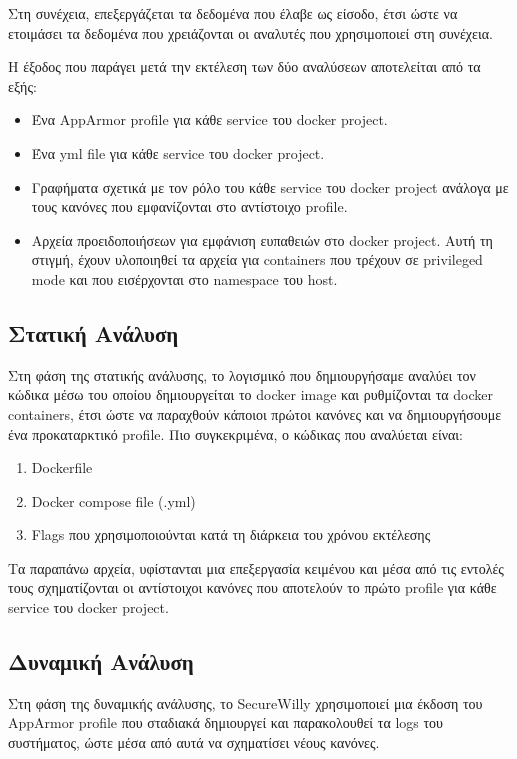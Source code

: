 Στη συνέχεια, επεξεργάζεται τα δεδομένα που έλαβε ως είσοδο, έτσι ώστε να ετοιμάσει τα δεδομένα που χρειάζονται οι αναλυτές που χρησιμοποιεί στη συνέχεια.

Η έξοδος που παράγει μετά την εκτέλεση των δύο αναλύσεων αποτελείται από τα εξής:
\begin{itemize}
\item Ένα \en AppArmor profile\gr{} για κάθε \en service\gr{} του \en docker project\gr{}.
\item Ένα \en yml file\gr{} για κάθε \en service\gr{} του \en docker project\gr{}.
\item Γραφήματα σχετικά με τον ρόλο του κάθε \en service\gr{} του \en docker project\gr{} ανάλογα με τους κανόνες που εμφανίζονται στο αντίστοιχο \en profile\gr{}.
\item Αρχεία προειδοποιήσεων για εμφάνιση ευπαθειών στο \en docker project\gr{}. Αυτή τη στιγμή, έχουν υλοποιηθεί τα αρχεία για \en containers\gr{} που τρέχουν σε \en privileged mode\gr{} και που εισέρχονται στο \en namespace\gr{} του \en host\gr{}. 
\end{itemize}

\subsection*{Στατική Ανάλυση}
Στη φάση της στατικής ανάλυσης, το λογισμικό που δημιουργήσαμε αναλύει τον κώδικα μέσω του οποίου δημιουργείται το \en docker image\gr{} και ρυθμίζονται τα \en docker containers\gr{}, έτσι ώστε να παραχθούν κάποιοι πρώτοι κανόνες και να δημιουργήσουμε ένα προκαταρκτικό \en profile\gr. Πιο συγκεκριμένα, ο κώδικας που αναλύεται είναι:\en
\begin{enumerate}
\item Dockerfile
\item Docker compose file (.yml)
\item Flags\gr{} που χρησιμοποιούνται κατά τη διάρκεια του χρόνου εκτέλεσης
\end{enumerate}
\gr{}
Τα παραπάνω αρχεία, υφίστανται μια επεξεργασία κειμένου και μέσα από τις εντολές τους σχηματίζονται οι αντίστοιχοι κανόνες που αποτελούν το πρώτο \en profile\gr{} για κάθε \en service\gr{} του \en docker project\gr{}.

\subsection*{Δυναμική Ανάλυση}
Στη φάση της δυναμικής ανάλυσης, το \en SecureWilly\gr{} χρησιμοποιεί μια έκδοση του \en AppArmor profile\gr{} που σταδιακά δημιουργεί και παρακολουθεί τα \en logs\gr{} του συστήματος, ώστε μέσα από αυτά να σχηματίσει νέους κανόνες. 

